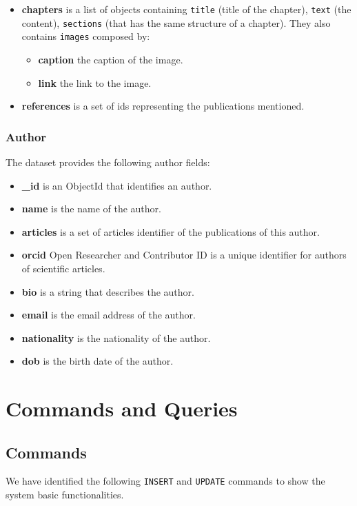 \documentclass{Configuration_Files/PoliMi3i_thesis}
\begin{document}
\begin{itemize}
\begin{itemize}
				\end{itemize}
\item \textbf{chapters} is a list of objects containing \verb |title| (title of the chapter), \verb |text| (the content),
	 \verb |sections| (that has the same structure of a chapter). They also contains \verb |images| composed by:
				\begin{itemize}
					\item \textbf{caption} the caption of the image.
					\item \textbf{link} the link to the image.
				\end{itemize}
\item \textbf{references} is a set of ids representing the publications mentioned.
\end{itemize}
\bigskip

\subsection{Author}
The dataset provides the following author fields:
\begin{itemize}
\item \textbf{\_id} is an ObjectId that identifies an author.
\item \textbf{name} is the name of the author.
\item \textbf{articles} is a set of articles identifier of the publications of this author.
\item \textbf{orcid} Open Researcher and Contributor ID is a unique identifier for authors of scientific articles.
\item \textbf{bio} is a string that describes the author.
\item \textbf{email} is the email address of the author.
\item \textbf{nationality} is the nationality of the author.
\item \textbf{dob} is the birth date of the author.
\end{itemize}


\chapter{Commands and Queries}
\label{ch:ceq}
\section{Commands}
We have identified the following \verb |INSERT| and \verb |UPDATE| commands to show the system basic functionalities.
\end{document}

